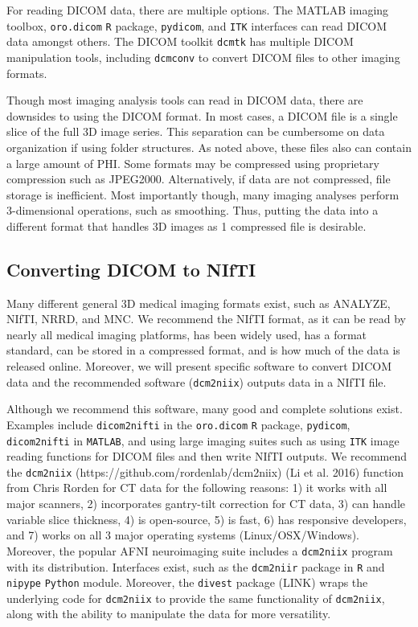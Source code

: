 \documentclass[]{elsarticle} %
\begin{document}
For reading DICOM data, there are multiple options. The MATLAB imaging toolbox, \texttt{oro.dicom} \texttt{R} package, \texttt{pydicom}, and \texttt{ITK} interfaces can read DICOM data amongst others. The DICOM toolkit \texttt{dcmtk} has multiple DICOM manipulation tools, including \texttt{dcmconv} to convert DICOM files to other imaging formats.

Though most imaging analysis tools can read in DICOM data, there are downsides to using the DICOM format. In most cases, a DICOM file is a single slice of the full 3D image series. This separation can be cumbersome on data organization if using folder structures. As noted above, these files also can contain a large amount of PHI. Some formats may be compressed using proprietary compression such as JPEG2000. Alternatively, if data are not compressed, file storage is inefficient. Most importantly though, many imaging analyses perform 3-dimensional operations, such as smoothing. Thus, putting the data into a different format that handles 3D images as 1 compressed file is desirable.

\hypertarget{converting-dicom-to-nifti}{%
\subsection{Converting DICOM to NIfTI}\label{converting-dicom-to-nifti}}

Many different general 3D medical imaging formats exist, such as ANALYZE, NIfTI, NRRD, and MNC. We recommend the NIfTI format, as it can be read by nearly all medical imaging platforms, has been widely used, has a format standard, can be stored in a compressed format, and is how much of the data is released online. Moreover, we will present specific software to convert DICOM data and the recommended software (\texttt{dcm2niix}) outputs data in a NIfTI file.

Although we recommend this software, many good and complete solutions exist. Examples include \texttt{dicom2nifti} in the \texttt{oro.dicom} \texttt{R} package, \texttt{pydicom}, \texttt{dicom2nifti} in \texttt{MATLAB}, and using large imaging suites such as using \texttt{ITK} image reading functions for DICOM files and then write NIfTI outputs. We recommend the \texttt{dcm2niix} (https://github.com/rordenlab/dcm2niix) (Li et al. 2016) function from Chris Rorden for CT data for the following reasons: 1) it works with all major scanners, 2) incorporates gantry-tilt correction for CT data, 3) can handle variable slice thickness, 4) is open-source, 5) is fast, 6) has responsive developers, and 7) works on all 3 major operating systems (Linux/OSX/Windows). Moreover, the popular AFNI neuroimaging suite includes a \texttt{dcm2niix} program with its distribution. Interfaces exist, such as the \texttt{dcm2niir} package in \texttt{R} and \texttt{nipype} \texttt{Python} module. Moreover, the \texttt{divest} package (LINK) wraps the underlying code for \texttt{dcm2niix} to provide the same functionality of \texttt{dcm2niix}, along with the ability to manipulate the data for more versatility.
\end{document}
